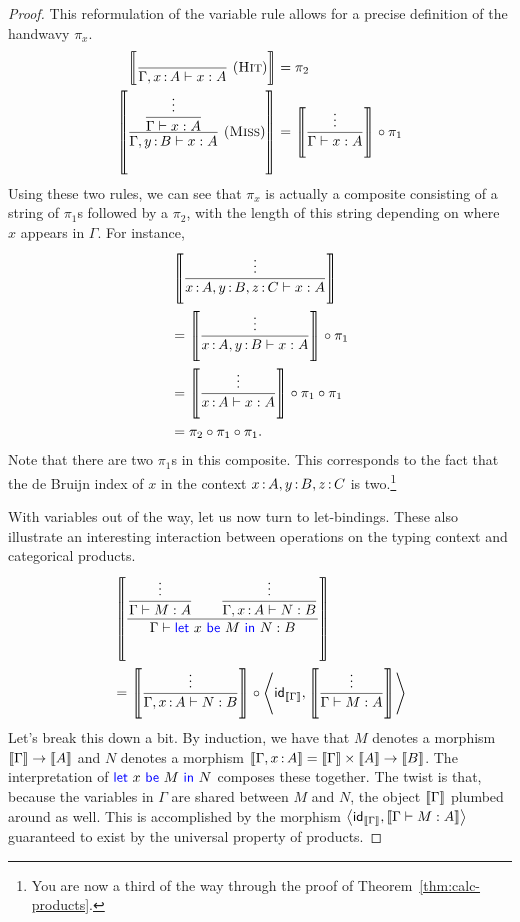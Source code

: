 \begin{proof}
  This reformulation of the variable rule allows for a precise
  definition of the handwavy \(\pi_x\).
  \begin{align}
    \left\llbracket 
      \frac
        {~}
        {\Gamma,x\,{:}\, A \vdash x : A}
        ~(\textsc{Hit})
    \right\rrbracket
    &= \pi_2
    \\
    \left\llbracket 
      \frac
        {\displaystyle\frac{\vdots}{\Gamma \vdash x : A}}
        {\Gamma,y\,{:}\, B \vdash x : A}
        ~(\textsc{Miss})
    \right\rrbracket
    &=
    \left\llbracket 
      \frac{\vdots}{\Gamma \vdash x : A}
    \right\rrbracket
    \circ \pi_1
  \end{align}
  Using these two rules,
  we can see that \(\pi_x\) is actually a composite consisting of a string of \(\pi_1\)s followed by a \(\pi_2\),
  with the length of this string depending on where \(x\) appears in \(\Gamma\). For instance,
  \begin{align}
    &\left\llbracket \frac{\vdots}{x\,{:}\, A, y\,{:}\, B, z\,{:}\, C \vdash x : A}\right\rrbracket \\
    &=
    \left\llbracket \frac{\vdots}{x\,{:}\, A, y\,{:}\, B \vdash x : A}\right\rrbracket \circ \pi_1 \\
    &=
    \left\llbracket \frac{\vdots}{x\,{:}\, A \vdash x : A}\right\rrbracket \circ \pi_1 \circ \pi_1 \\
    &=
    \pi_2 \circ \pi_1 \circ \pi_1.
  \end{align}
  Note that there are two \(\pi_1\)s in this composite. This corresponds to the fact that
  the de Bruijn index of \(x\) in the context \(x\,{:}\, A,y\,{:}\, B,z\,{:}\, C\) is two.\footnote{%
    You are now a third of the way through
  the proof of Theorem~\ref{thm:calc-products}.}


  With variables out of the way, let us now turn to let-bindings.
  These also illustrate an interesting interaction
  between operations on the typing context and categorical products.
  \begin{align*}
    &\left\llbracket 
      \frac
      {
        \displaystyle\frac{\vdots}{\Gamma\vdash M : A}
        \qquad
        \displaystyle\frac{\vdots}{\Gamma,x\,{:}\, A\vdash N : B}
      }
      {\Gamma\vdash \mathsf{{\color{blue}let}}~x~\mathsf{{\color{blue}be}}~M~\mathsf{{\color{blue}in}}~N : B}
    \right\rrbracket
    \\
    &=
    \left\llbracket \frac{\vdots}{\Gamma,x\,{:}\, A \vdash N : B}\right\rrbracket
    \circ
    \left\langle
    \mathsf{id}_{\left\llbracket \Gamma\right\rrbracket}
    ,
    \left\llbracket \frac{\vdots}{\Gamma\vdash M : A}\right\rrbracket
    \right\rangle
  \end{align*}
  Let's break this down a bit.
  By induction, we have that
  \(M\) denotes a morphism \(\left\llbracket \Gamma\right\rrbracket \to \left\llbracket A\right\rrbracket\)
  and \(N\) denotes a morphism \(\left\llbracket \Gamma,x\,{:}\, A\right\rrbracket = \left\llbracket \Gamma\right\rrbracket\times\left\llbracket A\right\rrbracket \to \left\llbracket B\right\rrbracket\).
  The interpretation of \(\mathsf{{\color{blue}let}}~x~\mathsf{{\color{blue}be}}~M~\mathsf{{\color{blue}in}}~N\)
  composes these together. The twist is that,
  because the variables in \(\Gamma\) are shared between \(M\)
  and \(N\), the object \(\left\llbracket \Gamma\right\rrbracket\)
  plumbed around as well.
  This is accomplished by the morphism
  \(
    \left\langle
    \mathsf{id}_{\left\llbracket \Gamma\right\rrbracket}
    ,
    \left\llbracket \Gamma\vdash M : A\right\rrbracket
    \right\rangle\)
    guaranteed to exist
    by the universal property of products.


\end{proof}
